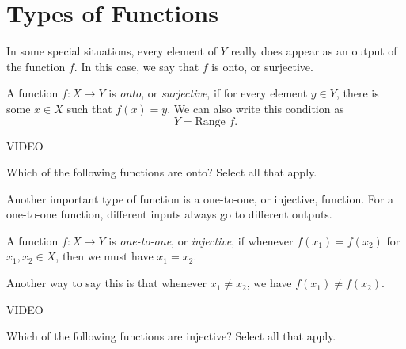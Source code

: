 \documentclass{ximera}
\begin{document}
\section{Types of Functions}

In some special situations, every element of $Y$ really does appear as an output of the function $f$. In this case, we say that $f$ is onto, or surjective.

\begin{definition}
A function $f:X\rightarrow Y$ is \emph{onto}, or \emph{surjective}, if for every element $y\in Y$, there is some $x\in X$ such that $f(x) = y$. We can also write this condition as 
\[
Y = \textrm{Range }f.
\]
\end{definition}

VIDEO

\begin{problem}
Which of the following functions are onto? Select all that apply.
\begin{selectAll}
\end{selectAll}
\end{problem}

Another important type of function is a one-to-one, or injective, function. For a one-to-one function, different inputs always go to different outputs.

\begin{definition}
A function $f:X\rightarrow Y$ is \emph{one-to-one}, or \emph{injective}, if whenever $f(x_1) = f(x_2)$ for $x_1,x_2\in X$, then we must have $x_1 = x_2$.

Another way to say this is that whenever $x_1\neq x_2$, we have $f(x_1)\neq f(x_2)$.
\end{definition}

VIDEO

\begin{problem}
Which of the following functions are injective? Select all that apply.
\begin{selectAll}
\end{selectAll}
\end{problem}
\end{document}
